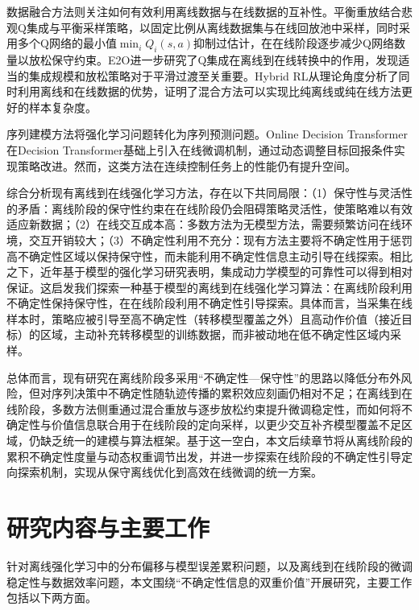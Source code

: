 数据融合方法则关注如何有效利用离线数据与在线数据的互补性。平衡重放\cite{Lee2022O2O}结合悲观Q集成与平衡采样策略，以固定比例从离线数据集与在线回放池中采样，同时采用多个Q网络的最小值$\min_{i} Q_i(s,a)$抑制过估计，在在线阶段逐步减少Q网络数量以放松保守约束。E2O\cite{Zhao2023E2O}进一步研究了Q集成在离线到在线转换中的作用，发现适当的集成规模和放松策略对于平滑过渡至关重要。Hybrid RL\cite{Song2023HybridRL}从理论角度分析了同时利用离线和在线数据的优势，证明了混合方法可以实现比纯离线或纯在线方法更好的样本复杂度。

序列建模方法将强化学习问题转化为序列预测问题。Online Decision Transformer\cite{Zheng2022ODT}在Decision Transformer基础上引入在线微调机制，通过动态调整目标回报条件实现策略改进。然而，这类方法在连续控制任务上的性能仍有提升空间。

综合分析现有离线到在线强化学习方法，存在以下共同局限：（1）保守性与灵活性的矛盾：离线阶段的保守性约束在在线阶段仍会阻碍策略灵活性，使策略难以有效适应新数据；（2）在线交互成本高：多数方法为无模型方法，需要频繁访问在线环境，交互开销较大；（3）不确定性利用不充分：现有方法主要将不确定性用于惩罚高不确定性区域以保持保守性，而未能利用不确定性信息主动引导在线探索。相比之下，近年基于模型的强化学习研究表明，集成动力学模型的可靠性可以得到相对保证\cite{Yu2020MOPO,Rigter2022RAMBO,Yu2021COMBO,Yang2023PMDB,Sun2024Conformal,Lu2022MBRL}。这启发我们探索一种基于模型的离线到在线强化学习算法：在离线阶段利用不确定性保持保守性，在在线阶段利用不确定性引导探索。具体而言，当采集在线样本时，策略应被引导至高不确定性（转移模型覆盖之外）且高动作价值（接近目标）的区域，主动补充转移模型的训练数据，而非被动地在低不确定性区域内采样。

总体而言，现有研究在离线阶段多采用“不确定性—保守性”的思路以降低分布外风险，但对序列决策中不确定性随轨迹传播的累积效应刻画仍相对不足；在离线到在线阶段，多数方法侧重通过混合重放与逐步放松约束提升微调稳定性，而如何将不确定性与价值信息联合用于在线阶段的定向采样，以更少交互补齐模型覆盖不足区域，仍缺乏统一的建模与算法框架。基于这一空白，本文后续章节将从离线阶段的累积不确定性度量与动态权重调节出发，并进一步探索在线阶段的不确定性引导定向探索机制，实现从保守离线优化到高效在线微调的统一方案。


\section{研究内容与主要工作}\label{Sec1.3}

针对离线强化学习中的分布偏移与模型误差累积问题，以及离线到在线阶段的微调稳定性与数据效率问题，本文围绕“不确定性信息的双重价值”开展研究，主要工作包括以下两方面。

